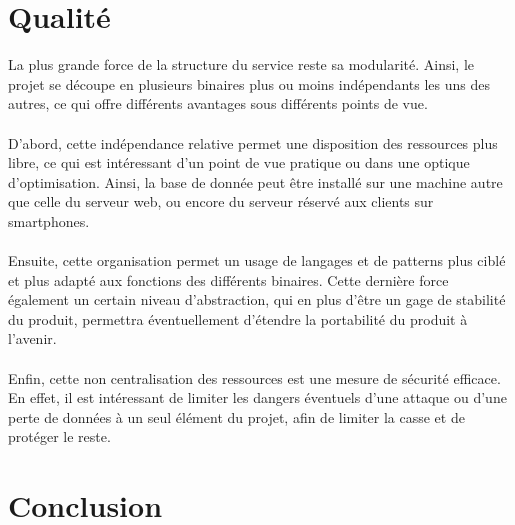 \documentclass{life-fr}
\begin{document}

\chapter{Qualité}

La plus grande force de la structure du service reste sa modularité. Ainsi, le projet se découpe en plusieurs binaires plus ou moins indépendants les uns des autres, ce qui offre différents avantages sous différents points de vue.\\
\\
D’abord, cette indépendance relative permet une disposition des ressources plus libre, ce qui est intéressant d’un point de vue pratique ou dans une optique d’optimisation. Ainsi, la base de donnée peut être installé sur une machine autre que celle du serveur web, ou encore du serveur réservé aux clients sur smartphones.\\
\\
Ensuite, cette organisation permet un usage de langages et de patterns plus ciblé et plus adapté aux fonctions des différents binaires. Cette dernière force également un certain niveau d’abstraction, qui en plus d'être un gage de stabilité du produit, permettra éventuellement d'étendre la portabilité du produit à l’avenir.\\
\\
Enfin, cette non centralisation des ressources est une mesure de sécurité efficace. En effet, il est intéressant de limiter les dangers éventuels d’une attaque ou d’une perte de données à un seul élément du projet, afin de limiter la casse et de protéger le reste.


\chapter{Conclusion}
\end{document}
